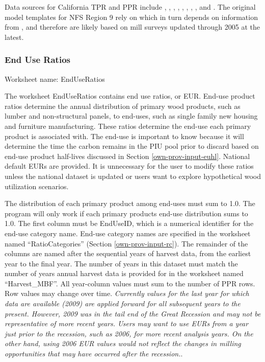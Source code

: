 \documentclass[
  openany]{book}
\begin{document}
Data sources for California TPR and PPR include \textcite{barrette1970}, \textcite{hiserote1978}, \textcite{howard1974}, \textcite{marcille2020}, \textcite{mciver2015}, \textcite{morgan2004}, \textcite{morgan2012}, \textcite{ward1995}, and \textcite{ward1997}. The original model templates for NFS Region 9 rely on \textcite{smith2006} which in turn depends on information from \textcite{adams2006}, and therefore are likely based on mill surveys updated through 2005 at the latest.

\hypertarget{own-prov-input-eur}{%
\subsubsection{End Use Ratios}\label{own-prov-input-eur}}

Worksheet name: EndUseRatios

The worksheet EndUseRatios contains end use ratios, or EUR. End-use product ratios determine the annual distribution of primary wood products, such as lumber and non-structural panels, to end-uses, such as single family new housing and furniture manufacturing. These ratios determine the end-use each primary product is associated with. The end-use is important to know because it will determine the time the carbon remains in the PIU pool prior to discard based on end-use product half-lives discussed in Section \ref{own-prov-input-euhl}. National default EURs are provided. It is unnecessary for the user to modify these ratios unless the national dataset is updated or users want to explore hypothetical wood utilization scenarios.

The distribution of each primary product among end-uses must sum to 1.0. The program will only work if each primary products end-use distribution sums to 1.0. The first column must be EndUseID, which is a numerical identifier for the end-use category name. End-use category names are specified in the worksheet named ``RatioCategories'' (Section \ref{own-prov-input-rc}). The remainder of the columns are named after the sequential years of harvest data, from the earliest year to the final year. The number of years in this dataset must match the number of years annual harvest data is provided for in the worksheet named ``Harvest\_MBF''. All year-column values must sum to the number of PPR rows. Row values may change over time. \emph{Currently values for the last year for which data are available (2009) are applied forward for all subsequent years to the present. However, 2009 was in the tail end of the Great Recession and may not be representative of more recent years. Users may want to use EURs from a year just prior to the recession, such as 2006, for more recent analysis years. On the other hand, using 2006 EUR values would not reflect the changes in milling opportunities that may have occurred after the recession.}.
\end{document}

